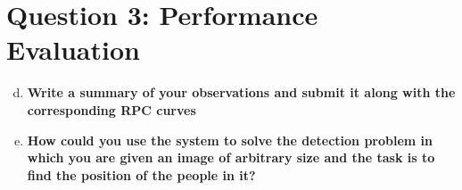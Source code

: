 \documentclass[12pt]{article}
\begin{document}
\newpage
\section*{Question 3: Performance Evaluation}
\begin{enumerate}[a)]
	\setcounter{enumi}{3}
	

	\item
        \textbf{Write a summary of your observations and submit it along with the corresponding RPC curves}\\

	\item 
        \textbf{How could you use the system to solve the detection problem in which you are given an image of arbitrary size and the task is to find the position of the people in it?}\\

\end{enumerate}
\end{document}
